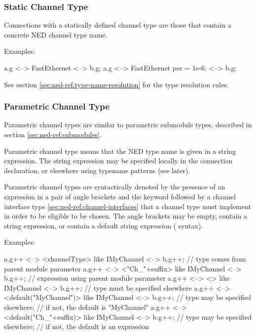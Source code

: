 \subsubsection{Static Channel Type}
\label{sec:ned-ref:static-channel-type}

Connections with a statically defined channel type are those that
contain a concrete NED channel type name.

Examples:

\begin{ned}
a.g <--> FastEthernet <--> b.g;
a.g <--> FastEthernet {per = 1e-6;} <--> b.g;
\end{ned}

See section \ref{sec:ned-ref:type-name-resolution} for the type resolution
rules.


\subsubsection{Parametric Channel Type}
\label{sec:ned-ref:parametric-channel-type}

Parametric channel types are similar to parametric submodule types,
described in section \ref{sec:ned-ref:submodules}.

Parametric channel type means that the NED type name is given in a string
expression. The string expression may be specified locally in the connection
declaration, or elsewhere using typename patterns (see later).

Parametric channel types are syntactically denoted by the presence of an
expression in a pair of angle brackets and the  keyword
followed by a channel interface type \ref{sec:ned-ref:channel-interfaces}
that a channel type must implement in order to be eligible to be chosen.
The angle brackets may be empty, contain a string expression, or contain a
default string expression ( syntax).

Examples:

\begin{ned}
a.g++ <--> <channelType> like IMyChannel <--> b.g++;
                                  // type comes from parent module parameter
a.g++ <--> <"Ch_"+suffix> like IMyChannel <--> b.g++;
                                  // expression using parent module parameter
a.g++ <--> <> like IMyChannel <--> b.g++;
                                  // type must be specified elsewhere
a.g++ <--> <default("MyChannel")> like IMyChannel <--> b.g++;
                                  // type may be specified elsewhere;
                                  // if not, the default is "MyChannel"
a.g++ <--> <default("Ch_"+suffix)> like IMyChannel <--> b.g++;
                                  // type may be specified elsewhere;
                                  // if not, the default is an expression
\end{ned}

